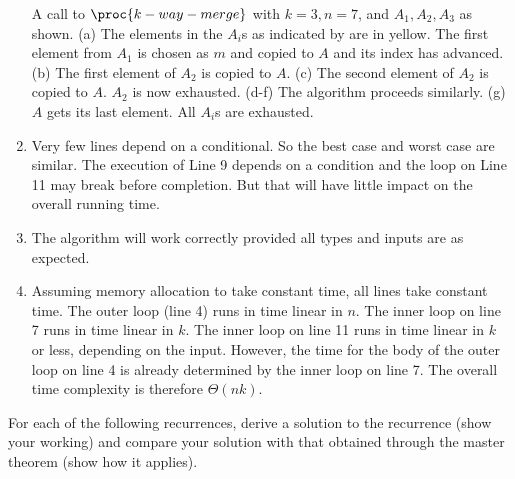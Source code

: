 \documentclass[a4paper]{exam}
\begin{document}
\begin{questions}
\begin{parts}
\begin{solution}
\begin{enumerate}
      A call to $\proc{k-way-merge}$ with $k=3, n=7$, and $A_1,A_2,A_3$ as shown. (a) The elements in the $A_i$s as indicated by  are in yellow. The first element from $A_1$ is chosen as $m$ and copied to $A$ and its index has advanced. (b) The first element of $A_2$ is copied to $A$. (c) The second element of $A_2$ is copied to $A$. $A_2$ is now exhausted. (d-f) The algorithm proceeds similarly. (g) $A$ gets its last element. All $A_i$s are exhausted.

    \item Very few lines depend on a conditional. So the best case and worst case are similar. The execution of Line 9 depends on a condition and the \For loop on Line 11 may break before completion. But that will have little impact on the overall running time.
    \item The algorithm will work correctly provided all types and inputs are as expected.
    \item Assuming memory allocation to take constant time, all lines take constant time. The outer \For loop (line 4) runs in time linear in $n$. The inner \For loop on line 7 runs in time linear in $k$. The inner \For loop on line 11 runs in time linear in $k$ or less, depending on the input. However, the time for the body of the outer \For loop on line 4 is already determined by the inner \For loop on line 7. The overall time complexity is therefore $\Theta(nk)$.
    \end{enumerate}
    \end{solution}
  \end{parts}
  
\question For each of the following recurrences, derive a solution to the recurrence (show your working) and compare your solution with that obtained through the master theorem (show how it applies). 
\end{questions}
\end{document}

